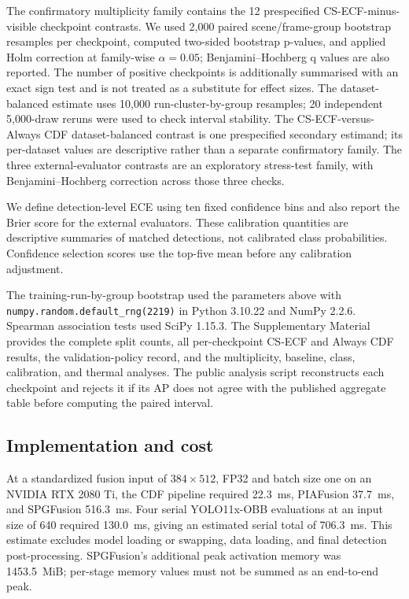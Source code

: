 \documentclass[preprint,11pt]{elsarticle}
\begin{document}
The confirmatory multiplicity family contains the 12 prespecified
CS-ECF-minus-visible checkpoint contrasts. We used 2,000 paired
scene/frame-group bootstrap resamples per checkpoint, computed two-sided
bootstrap p-values, and applied Holm correction at family-wise
\(\alpha=0.05\); Benjamini--Hochberg q values are also reported. The number of
positive checkpoints is additionally summarised with an exact sign test and is
not treated as a substitute for effect sizes. The dataset-balanced estimate
uses 10,000 run-cluster-by-group resamples; 20 independent 5,000-draw reruns
were used to check interval stability. The CS-ECF-versus-Always CDF
dataset-balanced contrast is one prespecified secondary estimand; its
per-dataset values are descriptive rather than a separate confirmatory family.
The three external-evaluator contrasts are an exploratory stress-test family,
with Benjamini--Hochberg correction across those three checks.

We define detection-level ECE using ten fixed confidence bins and also report
the Brier score for the external evaluators. These calibration quantities are
descriptive summaries of matched detections, not calibrated class
probabilities. Confidence selection scores use the top-five mean before any
calibration adjustment.

The training-run-by-group bootstrap used the parameters above with
\texttt{numpy.random.default\_rng(2219)} in Python 3.10.22 and NumPy 2.2.6.
Spearman association tests used SciPy 1.15.3.
The Supplementary Material provides the complete split counts, all
per-checkpoint CS-ECF and Always CDF results, the validation-policy record, and
the multiplicity, baseline, class, calibration, and thermal analyses. The
public analysis script reconstructs each checkpoint
and rejects it if its AP does not agree with the published aggregate table
before computing the paired interval.

\subsection{Implementation and cost}

At a standardized fusion input of \(384\times512\), FP32 and batch size one on
an NVIDIA RTX 2080 Ti, the CDF pipeline required \SI{22.3}{ms}, PIAFusion
\SI{37.7}{ms}, and SPGFusion \SI{516.3}{ms}. Four serial YOLO11x-OBB evaluations
at an input size of 640 required \SI{130.0}{ms}, giving an estimated serial
total of \SI{706.3}{ms}. This estimate excludes model loading or swapping, data
loading, and final detection post-processing. SPGFusion's additional peak
activation memory was \SI{1453.5}{MiB}; per-stage memory values must not be
summed as an end-to-end peak.
\end{document}
